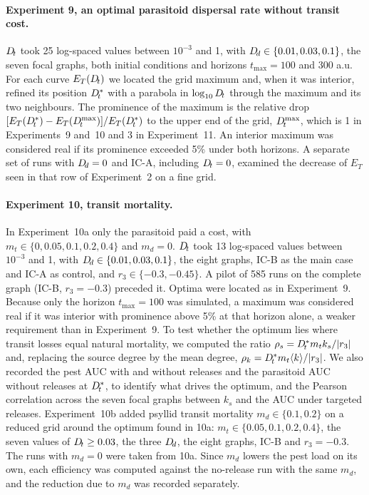 \paragraph{Experiment 9, an optimal parasitoid dispersal rate without transit cost.} $D_{\!t}$ took 25 log-spaced values between $10^{-3}$ and 1, with $D_{\!d} \in \{0.01, 0.03, 0.1\}$, the seven focal graphs, both initial conditions and horizons $t_{\max} = 100$ and 300 a.u. For each curve $E_T(D_{\!t})$ we located the grid maximum and, when it was interior, refined its position $D_{\!t}^*$ with a parabola in $\log_{10}D_{\!t}$ through the maximum and its two neighbours. The prominence of the maximum is the relative drop $[E_T(D_{\!t}^*) - E_T(D_{\!t}^{\max})]/E_T(D_{\!t}^*)$ to the upper end of the grid, $D_{\!t}^{\max}$, which is 1 in Experiments~9 and~10 and 3 in Experiment~11. An interior maximum was considered real if its prominence exceeded 5\% under both horizons. A separate set of runs with $D_{\!d} = 0$ and IC-A, including $D_{\!t} = 0$, examined the decrease of $E_T$ seen in that row of Experiment~2 on a fine grid.

\paragraph{Experiment 10, transit mortality.} In Experiment~10a only the parasitoid paid a cost, with $m_t \in \{0, 0.05, 0.1, 0.2, 0.4\}$ and $m_d = 0$. $D_{\!t}$ took 13 log-spaced values between $10^{-3}$ and 1, with $D_{\!d} \in \{0.01, 0.03, 0.1\}$, the eight graphs, IC-B as the main case and IC-A as control, and $r_3 \in \{-0.3, -0.45\}$. A pilot of 585 runs on the complete graph (IC-B, $r_3 = -0.3$) preceded it. Optima were located as in Experiment~9. Because only the horizon $t_{\max} = 100$ was simulated, a maximum was considered real if it was interior with prominence above 5\% at that horizon alone, a weaker requirement than in Experiment~9. To test whether the optimum lies where transit losses equal natural mortality, we computed the ratio $\rho_s = D_{\!t}^* m_t k_s/|r_3|$ and, replacing the source degree by the mean degree, $\rho_k = D_{\!t}^* m_t \langle k\rangle/|r_3|$. We also recorded the pest AUC with and without releases and the parasitoid AUC without releases at $D_{\!t}^*$, to identify what drives the optimum, and the Pearson correlation across the seven focal graphs between $k_s$ and the AUC under targeted releases. Experiment~10b added psyllid transit mortality $m_d \in \{0.1, 0.2\}$ on a reduced grid around the optimum found in 10a: $m_t \in \{0.05, 0.1, 0.2, 0.4\}$, the seven values of $D_{\!t} \geq 0.03$, the three $D_{\!d}$, the eight graphs, IC-B and $r_3 = -0.3$. The runs with $m_d = 0$ were taken from 10a. Since $m_d$ lowers the pest load on its own, each efficiency was computed against the no-release run with the same $m_d$, and the reduction due to $m_d$ was recorded separately.


